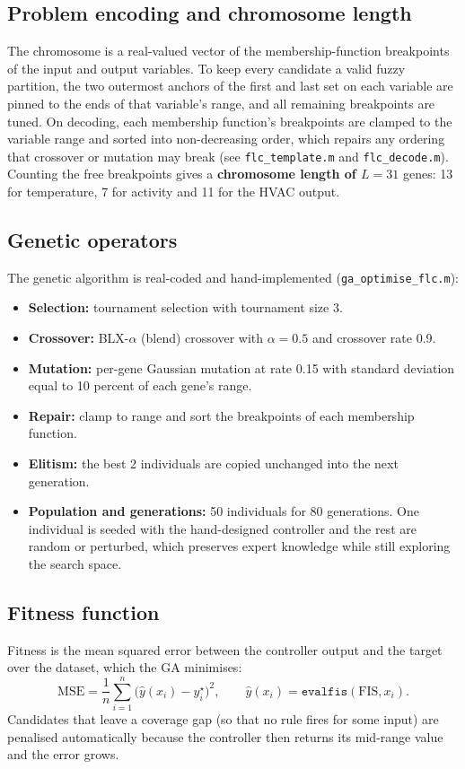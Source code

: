 \documentclass[11pt,a4paper]{article}
\begin{document}
\subsection{Problem encoding and chromosome length}
The chromosome is a real-valued vector of the membership-function breakpoints of the input and output
variables. To keep every candidate a valid fuzzy partition, the two outermost anchors of the first and
last set on each variable are pinned to the ends of that variable's range, and all remaining breakpoints
are tuned. On decoding, each membership function's breakpoints are clamped to the variable range and
sorted into non-decreasing order, which repairs any ordering that crossover or mutation may break
(see \texttt{flc\_template.m} and \texttt{flc\_decode.m}). Counting the free breakpoints gives a
\textbf{chromosome length of $L = 31$} genes: 13 for temperature, 7 for activity and 11 for the HVAC
output.

\subsection{Genetic operators}
The genetic algorithm is real-coded and hand-implemented (\texttt{ga\_optimise\_flc.m}):
\begin{itemize}
  \item \textbf{Selection:} tournament selection with tournament size 3.
  \item \textbf{Crossover:} BLX-$\alpha$ (blend) crossover with $\alpha = 0.5$ and crossover rate 0.9.
  \item \textbf{Mutation:} per-gene Gaussian mutation at rate 0.15 with standard deviation equal to
        10 percent of each gene's range.
  \item \textbf{Repair:} clamp to range and sort the breakpoints of each membership function.
  \item \textbf{Elitism:} the best 2 individuals are copied unchanged into the next generation.
  \item \textbf{Population and generations:} 50 individuals for 80 generations. One individual is seeded
        with the hand-designed controller and the rest are random or perturbed, which preserves expert
        knowledge while still exploring the search space.
\end{itemize}

\subsection{Fitness function}
Fitness is the mean squared error between the controller output and the target over the dataset, which the
GA minimises:
\begin{equation}
  \mathrm{MSE} = \frac{1}{n}\sum_{i=1}^{n}\big(\widehat{y}(x_i) - y^{\star}_i\big)^2,
  \qquad \widehat{y}(x_i) = \texttt{evalfis}(\text{FIS}, x_i).
\end{equation}
Candidates that leave a coverage gap (so that no rule fires for some input) are penalised automatically
because the controller then returns its mid-range value and the error grows.
\end{document}
